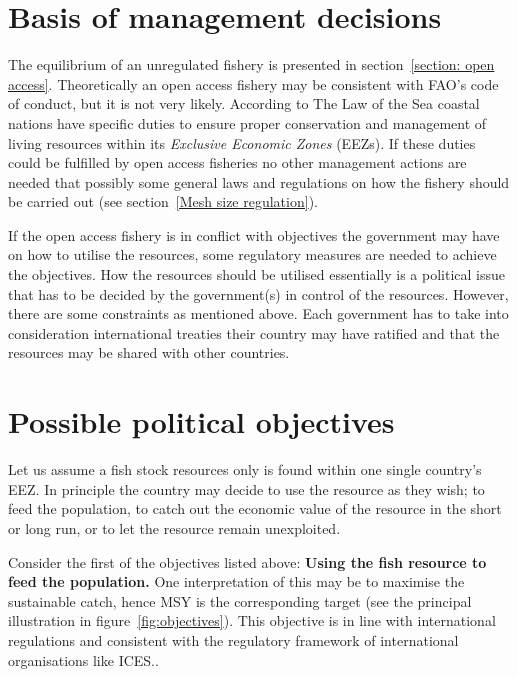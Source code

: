 \documentclass[11pt,fleqn]{book} %
\begin{document}
\section{Basis of management decisions}

The equilibrium of an unregulated fishery is presented in section~\ref{section: open access}. Theoretically an open access fishery may be consistent with FAO's code of conduct, but it is not very likely. According to The Law of the Sea coastal nations have specific duties to ensure proper conservation and management of living resources within its \textit{Exclusive Economic Zones} (EEZs). If these duties could be fulfilled by open access fisheries no other management actions are needed that possibly some general laws and regulations on how the fishery should be carried out (see section~\ref{Mesh size regulation}).

If the open access fishery is in conflict with objectives the government may have on how to utilise the resources, some regulatory measures are needed to achieve the objectives. How the resources should be utilised essentially is a political issue that has to be decided by the government(s) in control of the resources. However, there are some constraints as mentioned above. Each government has to take into consideration international treaties their country may have ratified and that the resources may be shared with other countries.

\section{Possible political objectives}\label{objectives}
Let us assume a fish stock resources only is found within one single country's EEZ. In principle the country may decide to use the resource as they wish; to feed the population, to catch out the economic value of the resource in the short or long run, or to let the resource remain unexploited.

Consider the first of the objectives listed above: \textbf{Using the fish resource to feed the population.} One interpretation of this may be to maximise the sustainable catch, hence MSY is the corresponding target (see the principal illustration in figure~\ref{fig:objectives}). This objective is in line with international regulations and consistent with the regulatory framework of international organisations like ICES..
\end{document}
